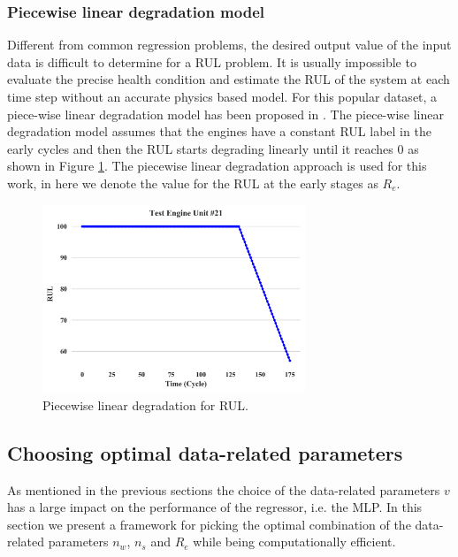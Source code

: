 \documentclass{article}
\begin{document}
\subsubsection{Piecewise linear degradation model}

Different from common regression problems, the desired output value of the input data is difficult to determine for a RUL problem. It is usually impossible to evaluate the precise health condition and estimate the RUL of the system at each time step without an accurate physics based model. For this popular dataset, a piece-wise linear degradation model has been proposed in \cite{Ramasso2014}. The piece-wise linear degradation model assumes that the engines have a constant RUL label in the early cycles and then the RUL starts degrading linearly until it reaches 0 as shown in Figure \ref{fig:piecewise_model}. The piecewise linear degradation approach is used for this work, in here we denote the value for the RUL at the early stages as $R_e$. 

\begin{figure}[!htb]
\centering
\includegraphics[width=0.7\textwidth]{../img/test_engine.png}
\caption{Piecewise linear degradation for RUL.}
\label{fig:piecewise_model}
\end{figure}

\subsection{Choosing optimal data-related parameters}
\label{sec:choosing_otimal_data-related_params}

As mentioned in the previous sections the choice of the data-related parameters $v$ has a large impact on the performance of the regressor, i.e. the MLP. In this section we present a framework for picking the optimal combination of the data-related parameters $n_w$, $n_s$ and $R_e$ while being computationally efficient.
\end{document}
